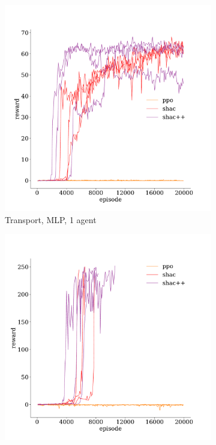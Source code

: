 \begin{figure}[t]
    \begin{subfigure}[b]{0.32\textwidth}
        \includegraphics[width=\textwidth]{figs/transport-1-mlp.pdf}
        \caption{Transport, MLP, 1 agent}
        \label{fig:transport-mlp-1}
    \end{subfigure}
    \begin{subfigure}[b]{0.32\textwidth}
        \includegraphics[width=\textwidth]{figs/transport-3-transformer.pdf}

\end{subfigure}
\end{figure}

